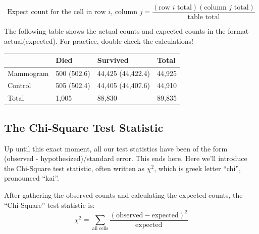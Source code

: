 \documentclass[
  letterpaper,
  DIV=11,
  numbers=noendperiod,
  oneside]{scrreprt}
\begin{document}
\begin{tcolorbox}[enhanced jigsaw, toprule=.15mm, colbacktitle=quarto-callout-note-color!10!white, title=\textcolor{quarto-callout-note-color}{\faInfo}\hspace{0.5em}{Expected Counts for a Two-Way Table}, arc=.35mm, colframe=quarto-callout-note-color-frame, colback=white, titlerule=0mm, left=2mm, bottomtitle=1mm, bottomrule=.15mm, breakable, opacitybacktitle=0.6, leftrule=.75mm, toptitle=1mm, coltitle=black, rightrule=.15mm, opacityback=0]

\[
\text{Expect count for the cell in row }i\text{, column }j = \frac{(\text{row }i\text{ total})(\text{column }j\text{ total})}{\text{table total}}
\]

\end{tcolorbox}

The following table shows the actual counts and expected counts in the
format actual(expected). For practice, double check the calculations!

\begin{longtable}[]{@{}llll@{}}
\toprule\noalign{}
& Died & Survived & Total \\
\midrule\noalign{}
\endhead
\bottomrule\noalign{}
\endlastfoot
Mammogram & 500 (502.6) & 44,425 (44,422.4) & 44,925 \\
Control & 505 (502.4) & 44,405 (44,407.6) & 44,910 \\
Total & 1,005 & 88,830 & 89,835 \\
\end{longtable}

\hypertarget{the-chi-square-test-statistic}{%
\subsection{The Chi-Square Test
Statistic}\label{the-chi-square-test-statistic}}

Up until this exact moment, all our test statistics have been of the
form (observed - hypothesized)/standard error. This ends here. Here
we'll introduce the Chi-Square test statistic, often written as
\(\chi^2\), which is greek letter ``chi'', pronounced ``kai''.

\begin{tcolorbox}[enhanced jigsaw, toprule=.15mm, colbacktitle=quarto-callout-note-color!10!white, title=\textcolor{quarto-callout-note-color}{\faInfo}\hspace{0.5em}{The \(\chi^2\) Test Statistic}, arc=.35mm, colframe=quarto-callout-note-color-frame, colback=white, titlerule=0mm, left=2mm, bottomtitle=1mm, bottomrule=.15mm, breakable, opacitybacktitle=0.6, leftrule=.75mm, toptitle=1mm, coltitle=black, rightrule=.15mm, opacityback=0]

After gathering the observed counts and calculating the expected counts,
the ``Chi-Square'' test statistic is: \[
\chi^2 = \sum_{\text{all cells}}\frac{(\text{observed} - \text{expected})^2}{\text{expected}}
\]

\end{tcolorbox}
\end{document}

